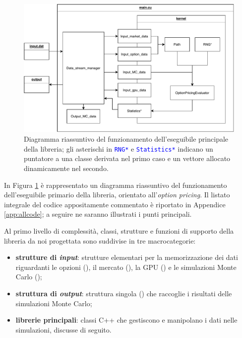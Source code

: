 \begin{figure}
    \centering
    \includegraphics[scale=0.8]{graphs/RecapMainCuDiagram.pdf}
    \caption[Diagramma del funzionamento dell'eseguibile principale della libreria.]{Diagramma riassuntivo del funzionamento dell'eseguibile principale della libreria; gli asterischi in \texttt{\textcolor{blue}{RNG*}} e \texttt{\textcolor{blue}{Statistics*}} indicano un puntatore a una classe derivata nel primo caso e un vettore allocato dinamicamente nel secondo.}
    \label{fig:diagram}
\end{figure}

In Figura \ref{fig:diagram} è rappresentato un diagramma riassuntivo del funzionamento dell'eseguibile primario della libreria, orientato all'\textit{option pricing}. Il listato integrale del codice appositamente commentato è riportato in Appendice \ref{app:allcode}; a seguire ne saranno illustrati i punti principali.

Al primo livello di complessità, classi, strutture e funzioni di supporto della libreria da noi progettata sono suddivise in tre macrocategorie:

\begin{itemize}
    \item \textbf{strutture di \textit{input}}: strutture elementari per la memorizzazione dei dati riguardanti le opzioni (), il mercato (), la GPU () e le simulazioni Monte Carlo ();
    \item \textbf{struttura di \textit{output}}: struttura singola () che raccoglie i risultati delle simulazioni Monte Carlo;
    \item \textbf{librerie principali}: classi C++ che gestiscono e manipolano i dati nelle simulazioni, discusse di seguito.
\end{itemize}

